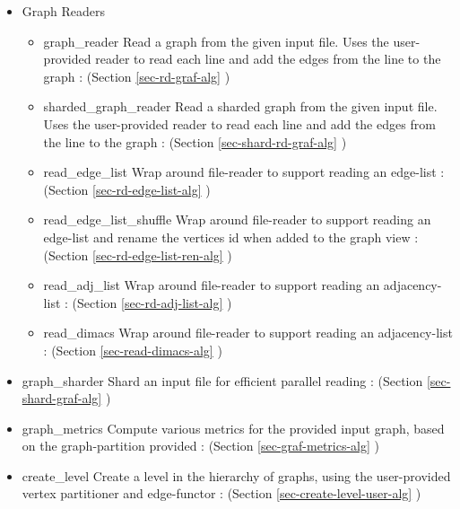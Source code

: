 \begin{itemize}
\item
Graph Readers
\begin{itemize}
\item
graph\_reader 
\newline
Read a graph from the given input file.  Uses the user-provided reader to read each line and add the edges from the line to the graph
 : (Section \ref{sec-rd-graf-alg} )
\item
sharded\_graph\_reader 
\newline
Read a sharded graph from the given input file.  Uses the user-provided reader to read each line and add the edges from the line to the graph
 : (Section \ref{sec-shard-rd-graf-alg} )
\item
read\_edge\_list 
\newline
Wrap around file-reader to support reading an edge-list
 : (Section \ref{sec-rd-edge-list-alg} )
\item
read\_edge\_list\_shuffle 
\newline
Wrap around file-reader to support reading an edge-list and rename the vertices id when added to the graph view
 : (Section \ref{sec-rd-edge-list-ren-alg} )
\item
read\_adj\_list 
\newline
Wrap around file-reader to support reading an adjacency-list
 : (Section \ref{sec-rd-adj-list-alg} )
\item
read\_dimacs 
\newline
Wrap around file-reader to support reading an adjacency-list
 : (Section \ref{sec-read-dimacs-alg} )
\end{itemize}

\item
graph\_sharder 
\newline
Shard an input file for efficient parallel reading
 : (Section \ref{sec-shard-graf-alg} )

\item
graph\_metrics 
\newline
Compute various metrics for the provided input graph, based on the graph-partition provided
 : (Section \ref{sec-graf-metrics-alg} )

\item
create\_level 
\newline
Create a level in the hierarchy of graphs, using the user-provided vertex partitioner and edge-functor
 : (Section \ref{sec-create-level-user-alg} )


\end{itemize}
